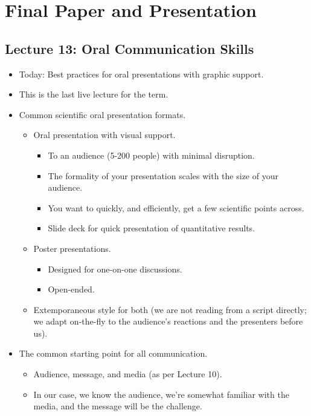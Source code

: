 \documentclass[../notes.tex]{subfiles}
\begin{document}
\chapter{Final Paper and Presentation}
\section{Lecture 13: Oral Communication Skills}
\begin{itemize}
    \item {}Today: Best practices for oral presentations with graphic support.
    \item This is the last live lecture for the term.
    \item Common scientific oral presentation formats.
    \begin{itemize}
        \item Oral presentation with visual support.
        \begin{itemize}
            \item To an audience (5-200 people) with minimal disruption.
            \item The formality of your presentation scales with the size of your audience.
            \item You want to quickly, and efficiently, get a few scientific points across.
            \item Slide deck for quick presentation of quantitative results.
        \end{itemize}
        \item Poster presentations.
        \begin{itemize}
            \item Designed for one-on-one discussions.
            \item Open-ended.
        \end{itemize}
        \item Extemporaneous style for both (we are not reading from a script directly; we adapt on-the-fly to the audience's reactions and the presenters before us).
    \end{itemize}
    \item The common starting point for all communication.
    \begin{itemize}
        \item Audience, message, and media (as per Lecture 10).
        \item In our case, we know the audience, we're somewhat familiar with the media, and the message will be the challenge.

\end{itemize}
\end{itemize}
\end{document}
